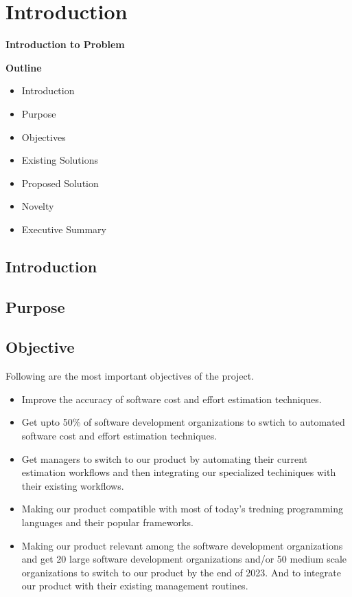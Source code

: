 \section{Introduction}

\vspace{20mm}

\Huge{\textbf{Introduction to Problem}}

\vspace{20mm}


\begin{abstract}
	\blindtext[2]
\end{abstract}

\vspace{20mm}

\large{\textbf{Outline}}

\begin{center}
	\begin{itemize}
		\item Introduction
		\item Purpose
		\item Objectives
		\item Existing Solutions
		\item Proposed Solution
		\item Novelty
		\item Executive Summary
	\end{itemize}
\end{center}
\pagebreak


\subsection{Introduction}
\blindtext[1]

\subsection{Purpose}
\blindtext[1]

\subsection{Objective}
Following are the most important objectives of the project.
\begin{itemize}
	\item Improve the accuracy of software cost and effort estimation techniques.
	\item Get upto 50\% of software development organizations to swtich to automated software cost and effort estimation techniques.
	\item Get managers to switch to our product by automating their current estimation workflows and then  integrating our specialized techiniques with their existing workflows.
	\item Making our product compatible with most of today's tredning programming languages and their popular frameworks.
	\item Making our product relevant among the software development organizations and get 20 large software development organizations and/or 50 medium scale organizations to switch to our product by the end of 2023. And to integrate our product with their existing management routines.
\end{itemize}

